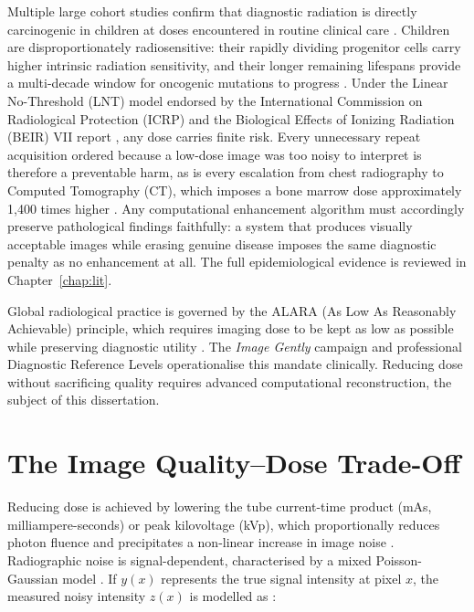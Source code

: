 \documentclass[12pt, a4paper, twoside, openright]{book}
\begin{document}
Multiple large cohort studies confirm that diagnostic radiation is directly carcinogenic in children at doses encountered in routine clinical care \cite{mathews_cancer_2013, hauptmann_brain_2023, bosch_de_basea_gomez_risk_2023, smith-bindman_hematologic_2025}. Children are disproportionately radiosensitive: their rapidly dividing progenitor cells carry higher intrinsic radiation sensitivity, and their longer remaining lifespans provide a multi-decade window for oncogenic mutations to progress \cite{national_research_council_health_2006, pearce_radiation_2012}. Under the Linear No-Threshold (LNT) model endorsed by the International Commission on Radiological Protection (ICRP) and the Biological Effects of Ionizing Radiation (BEIR) VII report \cite{international_commission_on_radiological_protection_2007_2007, national_research_council_health_2006}, any dose carries finite risk. Every unnecessary repeat acquisition ordered because a low-dose image was too noisy to interpret is therefore a preventable harm, as is every escalation from chest radiography to Computed Tomography (CT), which imposes a bone marrow dose approximately 1,400 times higher \cite{smith-bindman_hematologic_2025}. Any computational enhancement algorithm must accordingly preserve pathological findings faithfully: a system that produces visually acceptable images while erasing genuine disease imposes the same diagnostic penalty as no enhancement at all. The full epidemiological evidence is reviewed in Chapter~\ref{chap:lit}.

Global radiological practice is governed by the ALARA (As Low As Reasonably Achievable) principle, which requires imaging dose to be kept as low as possible while preserving diagnostic utility \cite{international_commission_on_radiological_protection_2007_2007}. The \textit{Image Gently} campaign \cite{strauss_image_2009} and professional Diagnostic Reference Levels operationalise this mandate clinically. Reducing dose without sacrificing quality requires advanced computational reconstruction, the subject of this dissertation.

\section{The Image Quality--Dose Trade-Off}
\label{sec:intro:tradeoff}

Reducing dose is achieved by lowering the tube current-time product (mAs, milliampere-seconds) or peak kilovoltage (kVp), which proportionally reduces photon fluence and precipitates a non-linear increase in image noise \cite{borges_noise_2020}. Radiographic noise is signal-dependent, characterised by a mixed Poisson-Gaussian model \cite{foi_practical_2008, borges_noise_2020}. If $y(x)$ represents the true signal intensity at pixel $x$, the measured noisy intensity $z(x)$ is modelled as \cite{foi_practical_2008}:
\end{document}
